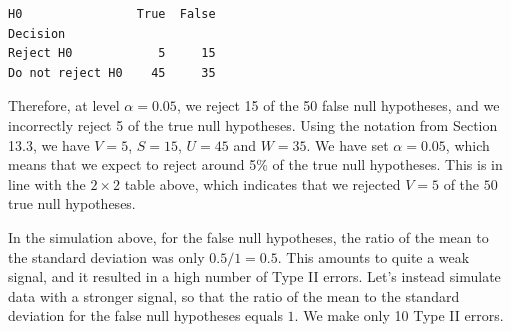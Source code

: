\documentclass[11pt]{article}
\makeatletter
\newcommand{\boxspacing}{\kern\kvtcb@left@rule\kern\kvtcb@boxsep}
\newcommand{\prompt}[4]{
        {\ttfamily\llap{{\color{#2}[#3]:\hspace{3pt}#4}}\vspace{-\baselineskip}}
    }
\makeatother
\begin{document}
            \begin{tcolorbox}[breakable, size=fbox, boxrule=.5pt, pad at break*=1mm, opacityfill=0]
\prompt{Out}{outcolor}{6}{\boxspacing}
\begin{Verbatim}[commandchars=\\\{\}]
H0                True  False
Decision
Reject H0            5     15
Do not reject H0    45     35
\end{Verbatim}
\end{tcolorbox}
        
    Therefore, at level \(\alpha=0.05\), we reject 15 of the 50 false null
hypotheses, and we incorrectly reject 5 of the true null hypotheses.
Using the notation from Section 13.3, we have \(V=5\), \(S=15\),
\(U=45\) and \(W=35\). We have set \(\alpha=0.05\), which means that we
expect to reject around 5\% of the true null hypotheses. This is in line
with the \(2 \times 2\) table above, which indicates that we rejected
\(V=5\) of the \(50\) true null hypotheses.

In the simulation above, for the false null hypotheses, the ratio of the
mean to the standard deviation was only \(0.5/1 = 0.5\). This amounts to
quite a weak signal, and it resulted in a high number of Type II errors.
Let's instead simulate data with a stronger signal, so that the ratio of
the mean to the standard deviation for the false null hypotheses equals
\(1\). We make only 10 Type II errors.
\end{document}
